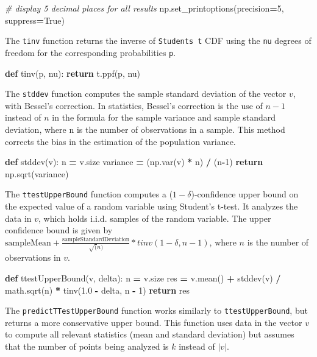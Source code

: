 \documentclass[12pt, twoside]{amherstthesis}
\newenvironment{Shaded}{\begin{snugshade}}{\end{snugshade}}
\newcommand{\CommentTok}[1]{\textcolor[rgb]{0.56,0.35,0.01}{\textit{#1}}}
\newcommand{\ControlFlowTok}[1]{\textcolor[rgb]{0.13,0.29,0.53}{\textbf{#1}}}
\newcommand{\DecValTok}[1]{\textcolor[rgb]{0.00,0.00,0.81}{#1}}
\newcommand{\FloatTok}[1]{\textcolor[rgb]{0.00,0.00,0.81}{#1}}
\newcommand{\KeywordTok}[1]{\textcolor[rgb]{0.13,0.29,0.53}{\textbf{#1}}}
\newcommand{\NormalTok}[1]{#1}
\newcommand{\OperatorTok}[1]{\textcolor[rgb]{0.81,0.36,0.00}{\textbf{#1}}}
\newcommand{\VariableTok}[1]{\textcolor[rgb]{0.00,0.00,0.00}{#1}}
\begin{document}
\begin{Shaded}
\begin{Highlighting}[]
\CommentTok{\# display 5 decimal places for all results}
\NormalTok{np.set\_printoptions(precision}\OperatorTok{=}\DecValTok{5}\NormalTok{, suppress}\OperatorTok{=}\VariableTok{True}\NormalTok{)}
\end{Highlighting}
\end{Shaded}
\noindent The \texttt{tinv} function returns the inverse of \texttt{Student\textquotesingle{}s\ t} CDF using the \texttt{nu} degrees of freedom for the corresponding probabilities \texttt{p}.
\begin{Shaded}
\begin{Highlighting}[]
\KeywordTok{def}\NormalTok{ tinv(p, nu):}
    \ControlFlowTok{return}\NormalTok{ t.ppf(p, nu)}
\end{Highlighting}
\end{Shaded}
\noindent The \texttt{stddev} function computes the sample standard deviation of the vector \(v\), with Bessel's correction. In statistics, Bessel's correction is the use of \(n-1\) instead of \(n\) in the formula for the sample variance and sample standard deviation, where n is the number of observations in a sample. This method corrects the bias in the estimation of the population variance.
\begin{Shaded}
\begin{Highlighting}[]
\KeywordTok{def}\NormalTok{ stddev(v):}
\NormalTok{    n }\OperatorTok{=}\NormalTok{ v.size}
\NormalTok{    variance }\OperatorTok{=}\NormalTok{ (np.var(v) }\OperatorTok{*}\NormalTok{ n) }\OperatorTok{/}\NormalTok{ (n}\OperatorTok{{-}}\DecValTok{1}\NormalTok{) }
    \ControlFlowTok{return}\NormalTok{ np.sqrt(variance) }
\end{Highlighting}
\end{Shaded}
\noindent The \texttt{ttestUpperBound} function computes a (\(1 - \delta\))-confidence upper bound on the expected value of a random variable using Student's t-test. It analyzes the data in \(v\), which holds i.i.d. samples of the random variable. The upper confidence bound is given by \(\text{sampleMean} + \frac{\text{sampleStandardDeviation}}{\sqrt(n)} * tinv(1-\delta, n-1)\), where \(n\) is the number of observations in \(v\).
\begin{Shaded}
\begin{Highlighting}[]
\KeywordTok{def}\NormalTok{ ttestUpperBound(v, delta):}
\NormalTok{    n  }\OperatorTok{=}\NormalTok{ v.size}
\NormalTok{    res }\OperatorTok{=}\NormalTok{ v.mean() }\OperatorTok{+}\NormalTok{ stddev(v) }\OperatorTok{/}\NormalTok{ math.sqrt(n) }\OperatorTok{*}\NormalTok{ tinv(}\FloatTok{1.0} \OperatorTok{{-}}\NormalTok{ delta, }
\NormalTok{    n }\OperatorTok{{-}} \DecValTok{1}\NormalTok{)}
    \ControlFlowTok{return}\NormalTok{ res}
\end{Highlighting}
\end{Shaded}
\noindent The \texttt{predictTTestUpperBound} function works similarly to \texttt{ttestUpperBound}, but returns a more conservative upper bound. This function uses data in the vector \(v\) to compute all relevant statistics (mean and standard deviation) but assumes that the number of points being analyzed is \(k\) instead of \(|v|\).
\end{document}
